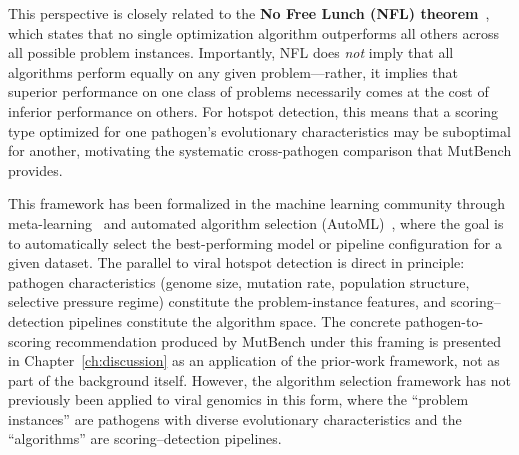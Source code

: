 This perspective is closely related to the \textbf{No Free Lunch (NFL) theorem}~\cite{wolpert1997nfl}, which states that no single optimization algorithm outperforms all others across all possible problem instances.
Importantly, NFL does \textit{not} imply that all algorithms perform equally on any given problem---rather, it implies that superior performance on one class of problems necessarily comes at the cost of inferior performance on others.
For hotspot detection, this means that a scoring type optimized for one pathogen's evolutionary characteristics may be suboptimal for another, motivating the systematic cross-pathogen comparison that MutBench provides.

This framework has been formalized in the machine learning community through meta-learning~\cite{kerschke2019algorithm,bischl2016aslib} and automated algorithm selection (AutoML)~\cite{feurer2015automl,kotthoff2016algorithm}, where the goal is to automatically select the best-performing model or pipeline configuration for a given dataset.
The parallel to viral hotspot detection is direct in principle: pathogen characteristics (genome size, mutation rate, population structure, selective pressure regime) constitute the problem-instance features, and scoring--detection pipelines constitute the algorithm space. The concrete pathogen-to-scoring recommendation produced by MutBench under this framing is presented in Chapter~\ref{ch:discussion} as an application of the prior-work framework, not as part of the background itself.
However, the algorithm selection framework has not previously been applied to viral genomics in this form, where the ``problem instances'' are pathogens with diverse evolutionary characteristics and the ``algorithms'' are scoring--detection pipelines.

